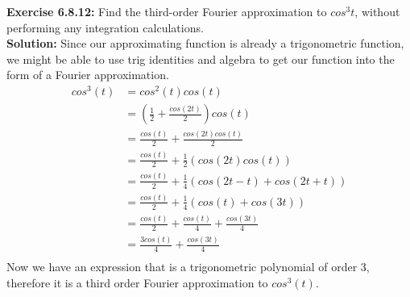 \documentclass{amsart}
\begin{document}
\vspace{1in}



\noindent\textbf{Exercise 6.8.12: } Find the third-order Fourier approximation to $cos^3t$, without performing any integration calculations.\\
\noindent \textbf{Solution: } Since our approximating function is already a trigonometric function, we might be able to use trig identities and algebra to get our function into the form of a Fourier approximation.
\begin{align*}
cos^3(t) &= cos^2(t) cos(t)\\
&= (\frac{1}{2}+\frac{cos(2t)}{2})cos(t)\\
&= \frac{cos(t)}{2}+\frac{cos(2t)cos(t)}{2}\\
&= \frac{cos(t)}{2}+\frac{1}{2}(cos(2t)cos(t))\\
&= \frac{cos(t)}{2}+\frac{1}{4}(cos(2t-t)+cos(2t+t))\\
&= \frac{cos(t)}{2}+\frac{1}{4}(cos(t)+cos(3t))\\
&= \frac{cos(t)}{2}+\frac{cos(t)}{4}+\frac{cos(3t)}{4}\\
&= \frac{3cos(t)}{4}+\frac{cos(3t)}{4}\\
\end{align*}
Now we have an expression that is a trigonometric polynomial of order 3, therefore it is a third order Fourier approximation to $cos^3(t)$.
\vspace{1in}
\end{document}
